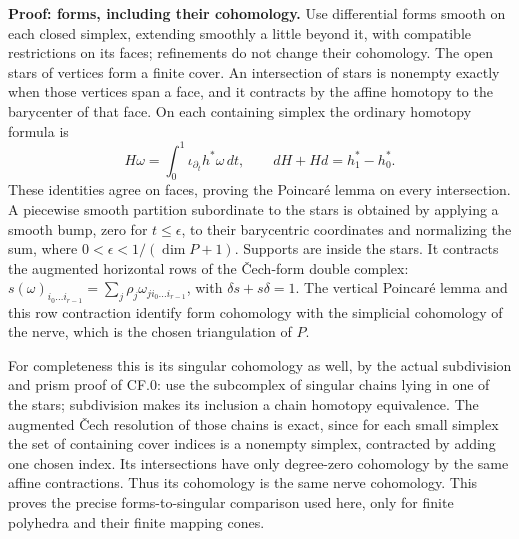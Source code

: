 \documentclass[
  11pt,
]{article}
\begin{document}
\textbf{Proof: forms, including their cohomology.} Use differential
forms smooth on each closed simplex, extending smoothly a little beyond
it, with compatible restrictions on its faces; refinements do not change
their cohomology. The open stars of vertices form a finite cover. An
intersection of stars is nonempty exactly when those vertices span a
face, and it contracts by the affine homotopy to the barycenter of that
face. On each containing simplex the ordinary homotopy formula is \[
 H\omega=\int_0^1\iota_{\partial_t}h^*\omega\,dt,\qquad
                   dH+Hd=h_1^*-h_0^* .
 \tag{R5}
\] These identities agree on faces, proving the Poincaré lemma on every
intersection. A piecewise smooth partition subordinate to the stars is
obtained by applying a smooth bump, zero for \(t\leq\epsilon\), to their
barycentric coordinates and normalizing the sum, where
\(0<\epsilon<1/(\dim P+1)\). Supports are inside the stars. It contracts
the augmented horizontal rows of the Čech-form double complex:
\(s(\omega)_{i_0\ldots i_{r-1}}=\sum_j\rho_j\omega_{j i_0\ldots i_{r-1}}\),
with \(\delta s+s\delta=1\). The vertical Poincaré lemma and this row
contraction identify form cohomology with the simplicial cohomology of
the nerve, which is the chosen triangulation of \(P\).

For completeness this is its singular cohomology as well, by the actual
subdivision and prism proof of CF.0: use the subcomplex of singular
chains lying in one of the stars; subdivision makes its inclusion a
chain homotopy equivalence. The augmented Čech resolution of those
chains is exact, since for each small simplex the set of containing
cover indices is a nonempty simplex, contracted by adding one chosen
index. Its intersections have only degree-zero cohomology by the same
affine contractions. Thus its cohomology is the same nerve cohomology.
This proves the precise forms-to-singular comparison used here, only for
finite polyhedra and their finite mapping cones.
\end{document}

